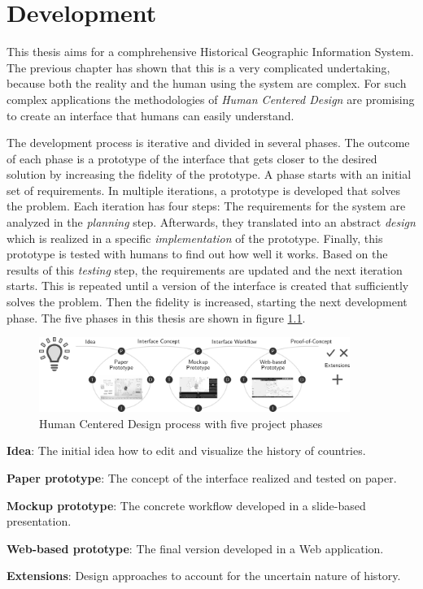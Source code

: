 
\chapter{Development} %
\label{cha:development}

This thesis aims for a comphrehensive Historical Geographic Information System. The previous chapter has shown that this is a very complicated undertaking, because both the reality and the human using the system are complex. For such complex applications the methodologies of \emph{Human Centered Design} are promising to create an interface that humans can easily understand.

The development process is iterative and divided in several phases. The outcome of each phase is a prototype of the interface that gets closer to the desired solution by increasing the fidelity of the prototype. A phase starts with an initial set of requirements. In multiple iterations, a prototype is developed that solves the problem. Each iteration has four steps: The requirements for the system are analyzed in the \emph{planning} step. Afterwards, they translated into an abstract \emph{design} which is realized in a specific \emph{implementation} of the prototype. Finally, this prototype is tested with humans to find out how well it works. Based on the results of this \emph{testing} step, the requirements are updated and the next iteration starts. This is repeated until a version of the interface is created that sufficiently solves the problem. Then the fidelity is increased, starting the next development phase. The five phases in this thesis are shown in figure \ref{fig:human_centered_design}.

\begin{figure}[H]
  \vspace{1em}
  \centering
  \includegraphics[width=0.9\textwidth]{graphics/development/human_centered_design}
  \caption{Human Centered Design process with five project phases}
  \label{fig:human_centered_design}
\end{figure}

\newpage
\begin{compactenum}
  \item \textbf{Idea}: The initial idea how to edit and visualize the history of countries.
  \item \textbf{Paper prototype}: The concept of the interface realized and tested on paper.
  \item \textbf{Mockup prototype}: The concrete workflow developed in a slide-based presentation.
  \item \textbf{Web-based prototype}: The final version developed in a Web application.
  \item \textbf{Extensions}: Design approaches to account for the uncertain nature of history.
\end{compactenum}

